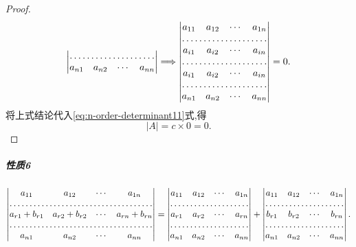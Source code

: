 \begin{proof}
\[\begin{vmatrix}
      \hdotsfor{4}\\
      a_{n1}&a_{n2}&\cdots&a_{nn}
      \end{vmatrix} \Longrightarrow
          \begin{vmatrix}
            a_{11}&a_{12}&\cdots&a_{1n}\\
      \hdotsfor{4}\\
      a_{i1}&a_{i2}&\cdots&a_{in}\\
      \hdotsfor{4}\\
      a_{i1}&a_{i2}&\cdots&a_{in}\\
      \hdotsfor{4}\\
      a_{n1}&a_{n2}&\cdots&a_{nn}
    \end{vmatrix} =0.
  \]
  将上式结论代入\eqref{eq:n-order-determinant11}式,得
  \[
   |A|=c\times 0 = 0.
  \]
\end{proof}

\subparagraph{\color{ecolor}性质6}

\[
  \begin{vmatrix}
    a_{11}&a_{12}&\cdots&a_{1n}\\
    \hdotsfor{4}\\
    a_{r1}+b_{r1}&a_{r2}+b_{r2}&\cdots&a_{rn}+b_{rn}\\
    \hdotsfor{4}\\
    a_{n1}&a_{n2}&\cdots&a_{nn}
  \end{vmatrix} =
  \begin{vmatrix}
    a_{11}&a_{12}&\cdots&a_{1n}\\
    \hdotsfor{4}\\
    a_{r1}&a_{r2}&\cdots&a_{rn}\\
    \hdotsfor{4}\\
    a_{n1}&a_{n2}&\cdots&a_{nn}    
  \end{vmatrix} +
  \begin{vmatrix}
    a_{11}&a_{12}&\cdots&a_{1n}\\
    \hdotsfor{4}\\
    b_{r1}&b_{r2}&\cdots&b_{rn}\\
    \hdotsfor{4}\\
    a_{n1}&a_{n2}&\cdots&a_{nn}    
  \end{vmatrix}.
\]

